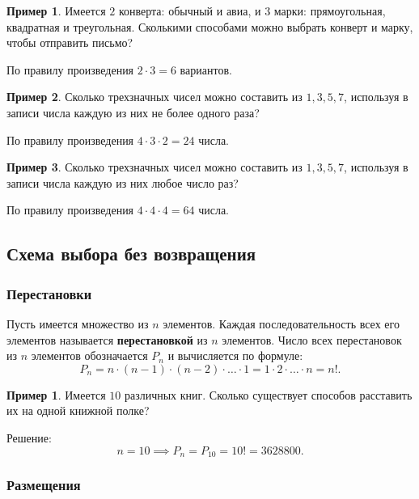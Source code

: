 \documentclass[a5paper, 11pt]{extarticle}
\theoremstyle{definition}
\newtheorem{example}{Пример}[subsection]
\newtheorem*{example*}{Пример}
\theoremstyle{definition}
\theoremstyle{definition}
\numberwithin{figure}{section}
\numberwithin{table}{section}
\begin{document}
\begin{example}
    Имеется \(2\) конверта: обычный и авиа, и \(3\) марки: прямоугольная, квадратная и треугольная. Сколькими способами можно выбрать конверт и марку, чтобы отправить письмо?

    По правилу произведения \(2 \cdot 3 = 6\) вариантов.
\end{example}

\begin{example}
    Сколько трехзначных чисел можно составить из \(1, 3, 5, 7\), используя в записи числа каждую из них не более одного раза?

    По правилу произведения \(4 \cdot 3 \cdot 2 = 24\) числа.
\end{example}

\begin{example}
    Сколько трехзначных чисел можно составить из \(1, 3, 5, 7\), используя в записи числа каждую из них любое число раз?

    По правилу произведения \(4 \cdot 4 \cdot 4 = 64\) числа.
\end{example}

\subsection{Схема выбора без возвращения}

\subsubsection{Перестановки}

Пусть имеется множество из \(n\) элементов. Каждая последовательность всех его элементов называется \textbf{перестановкой} из \(n\) элементов. Число всех перестановок из \(n\) элементов обозначается \(P_n\) и вычисляется по формуле:
\[
    P_n = n \cdot (n - 1) \cdot (n - 2) \cdot \ldots \cdot 1 = 1 \cdot 2 \cdot \ldots \cdot n = n!.
\]

\begin{example*}
    Имеется \(10\) различных книг. Сколько существует способов расставить их на одной книжной полке?

    Решение:
    \[
        n = 10
        \implies
        P_n = P_{10} = 10! = 3628800.
    \]
\end{example*}

\subsubsection{Размещения}
\end{document}

